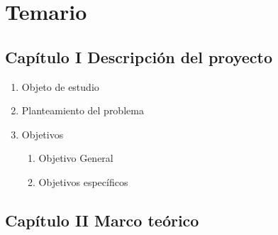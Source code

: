 


\section{Temario}
\label{temario}


\subsection{Capítulo I Descripción del proyecto}
		\begin{enumerate}
			\item Objeto de estudio
			\item Planteamiento del problema
			\item Objetivos
				\begin{enumerate}
					\item Objetivo General
					\item Objetivos específicos 
				\end{enumerate}		
		\end{enumerate}
	
\subsection{Capítulo II Marco teórico}

